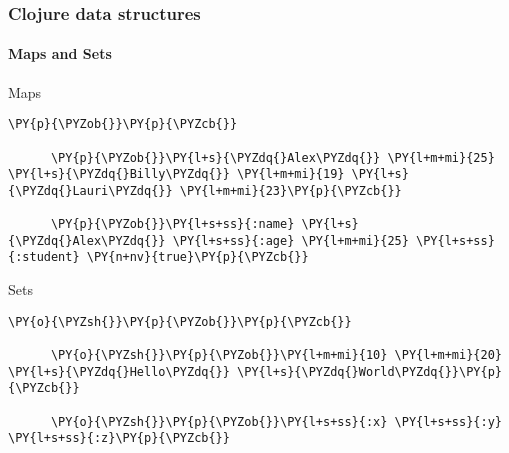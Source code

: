 \begin{frame}[fragile]
  \frametitle{Clojure data structures}
  \framesubtitle{Maps and Sets}

  \begin{block}{Maps}
    \begin{Verbatim}[commandchars=\\\{\}]
      \PY{p}{\PYZob{}}\PY{p}{\PYZcb{}}

      \PY{p}{\PYZob{}}\PY{l+s}{\PYZdq{}Alex\PYZdq{}} \PY{l+m+mi}{25} \PY{l+s}{\PYZdq{}Billy\PYZdq{}} \PY{l+m+mi}{19} \PY{l+s}{\PYZdq{}Lauri\PYZdq{}} \PY{l+m+mi}{23}\PY{p}{\PYZcb{}}

      \PY{p}{\PYZob{}}\PY{l+s+ss}{:name} \PY{l+s}{\PYZdq{}Alex\PYZdq{}} \PY{l+s+ss}{:age} \PY{l+m+mi}{25} \PY{l+s+ss}{:student} \PY{n+nv}{true}\PY{p}{\PYZcb{}}
    \end{Verbatim}
  \end{block}

  \begin{block}{Sets}
    \begin{Verbatim}[commandchars=\\\{\}]
      \PY{o}{\PYZsh{}}\PY{p}{\PYZob{}}\PY{p}{\PYZcb{}}

      \PY{o}{\PYZsh{}}\PY{p}{\PYZob{}}\PY{l+m+mi}{10} \PY{l+m+mi}{20} \PY{l+s}{\PYZdq{}Hello\PYZdq{}} \PY{l+s}{\PYZdq{}World\PYZdq{}}\PY{p}{\PYZcb{}}

      \PY{o}{\PYZsh{}}\PY{p}{\PYZob{}}\PY{l+s+ss}{:x} \PY{l+s+ss}{:y} \PY{l+s+ss}{:z}\PY{p}{\PYZcb{}}
    \end{Verbatim}
  \end{block}
\end{frame}


